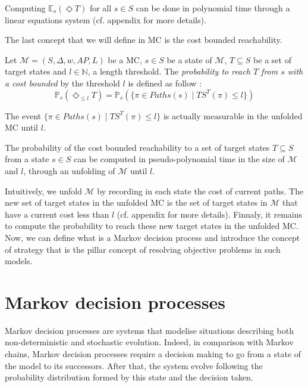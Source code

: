 \begin{theorem}
  Computing $\mathbb{E}_s(\Diamond T)$ for all $s \in S$ can be done in polynomial time through a linear equations system (cf. appendix for more details).
\end{theorem}

The last concept that we will define in MC is the cost bounded reachability.

\begin{definition}
	Let $\mathcal{M} = (S, \Delta, w, AP, L)$ be a MC, $s \in S$ be a state of $\mathcal{M}$, $T \subseteq S$ be a set of target states and $l \in \mathbb{N}$, a length threshold.
  The \textit{probability to reach $T$ from $s$ with a cost bounded} by the threshold $l$ is defined as follow :
	\[
    \mathbb{P}_s(\Diamond_{\leq l} T) = \mathbb{P}_s(\{\pi \in Paths(s) \; | \; TS^T(\pi) \leq l \})
  \]
\end{definition}
The event $\{\pi \in Paths(s) \; | \; TS^T(\pi) \leq l \}$ is actually measurable
in the unfolded MC until $l$.
\begin{theorem}
  The probability of the cost bounded reachability to a set of target states $T \subseteq S$ from a state $s \in S$ can be computed in pseudo-polynomial time in the size of $\mathcal{M}$ and $l$, through an unfolding of $\mathcal{M}$ until $l$.
\end{theorem}

Intuitively, we unfold $\mathcal{M}$ by recording in each state the cost of
current paths. The new set of target states in the unfolded MC is the set of
target states in $\mathcal{M}$ that have a current cost less than $l$ (cf.
appendix for more details). Finnaly, it remains to compute the probability to
reach these new target states in the unfolded MC. \\

Now, we can define what is a Markov decision process and introduce the concept of strategy that is the pillar concept of resolving objective problems in such models.

\section{Markov decision processes}
Markov decision processes are systems that modelise situations describing both non-deterministic and stochastic evolution. Indeed, in comparison with Markov chains, Markov decision processes require a decision making to go from a state of the model to its successors. After that, the system evolve following the probability distribution formed by this state and the decision taken.

